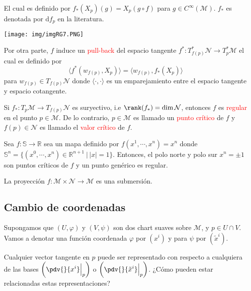\documentclass[../main]{subfiles}
\begin{document}
El cual es definido por $f_{*}(X_p)(g)=X_p(g \circ f)$ para $g \in C^{\infty}(\mathcal{M})$. $f_*$ es denotada por $\mathrm{d}f_p$ en la literatura.
\begin{center}
    \texttt{[image: img/imgRG7.PNG]}
\end{center}

Por otra parte, $f$ induce un \textcolor{red}{pull-back} del espacio tangente $f^{*}: T^{*}_{f(p)}\mathcal{N} \rightarrow T^{*}_p \mathcal{M}$ el cual es definido por 
\begin{equation}
    \langle f^*(w_{f(p)}, X_p)\rangle = \langle w_{f(p)}, f_*(X_p)\rangle
\end{equation}
para $w_{f(p)} \in T_{f(p)}\mathcal{N}$ donde $\langle \cdot, \cdot \rangle$ es un emparejamiento entre el espacio tangente y espacio cotangente.

Si $f_*: T_p \mathcal{M}\rightarrow T_{f(p)}\mathcal{N}$ es suryectivo, i.e $\rank(f_*)=\dim \mathcal{N}$, entonces $f$ es \textcolor{red}{regular} en el punto $p \in \mathcal{M}$. De lo contrario, $p \in \mathcal{M}$ es llamado un \textcolor{red}{punto crítico} de $f$ y $f(p) \in \mathcal{N}$ es llamado el \textcolor{red}{valor crítico} de $f$.

\ejemplo{} Sea $f: \mathbb{S} \rightarrow \mathbb{R}$ sea un mapa definido por $f(x^1, \cdots, x^n)=x^n$ donde $\mathbb{S}^n=\{(x^0, \cdots, x^n) \in \mathbb{R}^{n+1} \ | \ |x|=1\}$. Entonces, el polo norte y polo sur $x^n=\pm 1$ son puntos críticos de $f$ y un punto genérico es regular. 


\ejemplo{} La proyección $f: \mathcal{M} \times \mathcal{N} \rightarrow \mathcal{M}$ es una submersión.

\subsection{Cambio de coordenadas}
Supongamos que $(U, \varphi)$ y $(V, \psi)$ son dos chart suaves sobre $\mathcal{M}$, y $p \in U\cap V$. Vamos a denotar una función coordenada $\varphi$ por $(x^{i})$ y para $\psi$ por $(\tilde{x}^{i})$.

Cualquier vector tangente en $p$ puede ser representado con respecto a cualquiera de las bases $\displaystyle \left(\pdv{}{x^{i}}\Big{|}_p\right)$ o $\displaystyle \left(\pdv{}{\tilde{x}^{i}}\Big{|}_p\right)$. ¿Cómo pueden estar relacionadas estas representaciones?
\end{document}
